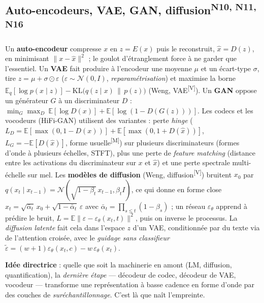 \documentclass[10pt,a4paper]{article}
\newcommand{\sV}{\textsuperscript{\scriptsize\textcolor{green!40!black}{[V]}}}
\newcommand{\sM}{\textsuperscript{\scriptsize\textcolor{red!70!black}{[M]}}}
\newcommand{\nref}[1]{\textsuperscript{\scriptsize\textcolor{black!55}{#1}}}
\begin{document}
\subsection{Auto-encodeurs, VAE, GAN, diffusion\nref{N10, N11, N16}}
Un \textbf{auto-encodeur} compresse $x$ en $z=E(x)$ puis le reconstruit, $\hat x=D(z)$, en minimisant $\|x-\hat x\|^2$ ; le goulot d'étranglement force à ne garder que l'essentiel. Un \textbf{VAE} fait produire à l'encodeur une moyenne $\mu$ et un écart-type $\sigma$, tire $z=\mu+\sigma\odot\varepsilon$ ($\varepsilon\sim\mathcal N(0,I)$, \emph{reparamétrisation}) et maximise la borne $\mathbb E_q[\log p(x\mid z)]-\mathrm{KL}\big(q(z\mid x)\,\|\,p(z)\big)$ (Weng, VAE\sV). Un \textbf{GAN} oppose un générateur $G$ à un discriminateur $D$ : $\min_G\max_D\ \mathbb E[\log D(x)]+\mathbb E[\log(1-D(G(z)))]$. Les codecs et les vocodeurs (HiFi-GAN) utilisent des variantes : perte \emph{hinge} ($L_D=\mathbb E[\max(0,1-D(x))]+\mathbb E[\max(0,1+D(\hat x))]$, $L_G=-\mathbb E[D(\hat x)]$, forme usuelle\sM) sur plusieurs discriminateurs (formes d'onde à plusieurs échelles, STFT), plus une perte de \emph{feature matching} (distance entre les activations du discriminateur sur $x$ et $\hat x$) et une perte spectrale multi-échelle sur mel. Les \textbf{modèles de diffusion} (Weng, diffusion\sV) bruitent $x_0$ par $q(x_t\mid x_{t-1})=\mathcal N(\sqrt{1-\beta_t}\,x_{t-1},\beta_t I)$, ce qui donne en forme close $x_t=\sqrt{\bar\alpha_t}\,x_0+\sqrt{1-\bar\alpha_t}\,\varepsilon$ avec $\bar\alpha_t=\prod_{s\le t}(1-\beta_s)$ ; un réseau $\varepsilon_\theta$ apprend à prédire le bruit, $L=\mathbb E\|\varepsilon-\varepsilon_\theta(x_t,t)\|^2$, puis on inverse le processus. La \emph{diffusion latente} fait cela dans l'espace $z$ d'un VAE, conditionnée par du texte via de l'attention croisée, avec le \emph{guidage sans classifieur} $\tilde\varepsilon=(w+1)\varepsilon_\theta(x_t,c)-w\,\varepsilon_\theta(x_t)$.

\textbf{Idée directrice} : quelle que soit la machinerie en amont (LM, diffusion, quantification), la \emph{dernière étape} --- décodeur de codec, décodeur de VAE, vocodeur --- transforme une représentation à basse cadence en forme d'onde par des couches de \emph{suréchantillonnage}. C'est là que naît l'empreinte.
\end{document}
